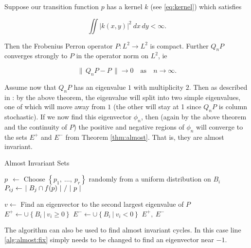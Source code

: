 \begin{theorem}
    \label{thm:QnP}
    \cite*{attr}
    Suppose our transition function $p$ has a kernel $k$ (see \autoref{eq:kernel}) which 
    satisfies 

    \begin{equation}
        \iint |k(x, y)|^2\ dx\,dy < \infty. 
    \end{equation}

    Then the Frobenius Perron operator $P : L^2 \to L^2$ is compact. Further $Q_n P$ 
    converges strongly to $P$ in the operator norm on $L^2$, ie

    \begin{equation}
        \|\, Q_n P - P \,\| \to 0 \quad \text{as} \quad n \to \infty .
    \end{equation}

\end{theorem}

Assume now that $Q_n P$ has an eigenvalue $1$ with multiplicity $2$. Then 
as described in \cite*{algGAIO}: by the above 
theorem, the eigenvalue will split into two simple eigenvalues, one of which will move away  
from $1$ (the other will stay at 1 since $Q_n P$ is column stochastic). If we now find 
this eigenvector $\phi_n$, then (again by the above theorem and the continuity of $P$) 
the positive and negative regions of $\phi_n$ will converge to the sets $E^+$ and $E^-$ 
from Theorem \ref{thm:almost}. That is, they are almost invariant. 

\begin{algorithm}
    \caption{Almost Invariant Sets}
    \label{alg:almost}
    \begin{spacing}{1.2}
        \begin{algorithmic}[1]

                \State $p\ \ \gets $ Choose $\left\{ p_1,\ \ldots,\ p_r \right\}$ randomly from a uniform distribution on $B_i$
                \State $P_{ij} \gets \left. |\ B_j \cap f(p)\ | \ \middle/\ |\ p\ | \right.$
            \EndFor
    
            \State $v \gets $ Find an eigenvector to the second largest eigenvalue of $P$
            \label{alg:almost:fix}
            \State $E^+ \gets \cup \left\{ B_i\ \vert\ v_i \geq 0 \right\}$
            \State $E^- \gets \cup \left\{ B_i\ \vert\ v_i < 0 \right\}$
            \State \Return $E^+,\ E^-$
        \end{algorithmic}
    \end{spacing}
\end{algorithm}

\begin{remark}
    The algorithm can also be used to find almost invariant cycles. In this case line 
    \ref{alg:almost:fix} simply needs to be changed to find an eigenvector near $-1$.
\end{remark} 

